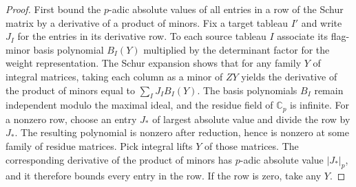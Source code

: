 \begin{proof}
First bound the $p$-adic absolute values of all entries in a row of the Schur matrix by a derivative of a product of minors. Fix a target tableau $I'$ and write $J_I$ for the entries in its derivative row. To each source tableau $I$ associate its flag-minor basis polynomial $B_I(Y)$ multiplied by the determinant factor for the weight representation. The Schur expansion shows that for any family $Y$ of integral matrices, taking each column as a minor of $ZY$ yields the derivative of the product of minors equal to $\sum_I J_I B_I(Y)$. The basis polynomials $B_I$ remain independent modulo the maximal ideal, and the residue field of $\mathbb C_p$ is infinite. For a nonzero row, choose an entry $J_\ast$ of largest absolute value and divide the row by $J_\ast$. The resulting polynomial is nonzero after reduction, hence is nonzero at some family of residue matrices. Pick integral lifts $Y$ of those matrices. The corresponding derivative of the product of minors has $p$-adic absolute value $|J_\ast|_p$, and it therefore bounds every entry in the row. If the row is zero, take any $Y$.


\end{proof}
